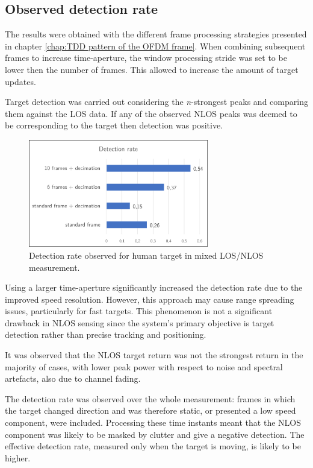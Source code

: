 \subsection{Observed detection rate}

The results were obtained with the different frame processing strategies presented in chapter \ref{chap:TDD pattern of the OFDM frame}. When combining subsequent frames to increase time-aperture, the window processing stride was set to be lower then the number of frames. This allowed to increase the amount of target updates.

Target detection was carried out considering the \textit{n}-strongest peaks and comparing them against the LOS data. If any of the observed NLOS peaks was deemed to be corresponding to the target then detection was positive.

\begin{figure}[H]
	\centering
	\includegraphics[width=0.7\textwidth]{Images/Test1/detect_hist.png}
	\caption{Detection rate observed for human target in mixed LOS/NLOS measurement.}
	\label{fig:Test1_detect_hist}
\end{figure}

Using a larger time-aperture significantly increased the detection rate due to the improved speed resolution. However, this approach may cause range spreading issues, particularly for fast targets. This phenomenon is not a significant drawback in NLOS sensing since the system's primary objective is target detection rather than precise tracking and positioning.

It was observed that the NLOS target return was not the strongest return in the majority of cases, with lower peak power with respect to noise and spectral artefacts, also due to channel fading.

The detection rate was observed over the whole measurement: frames in which the target changed direction and was therefore static, or presented a low speed component, were included. Processing these time instants meant that the NLOS component was likely to be masked by clutter and give a negative detection. The effective detection rate, measured only when the target is moving, is likely to be higher.

